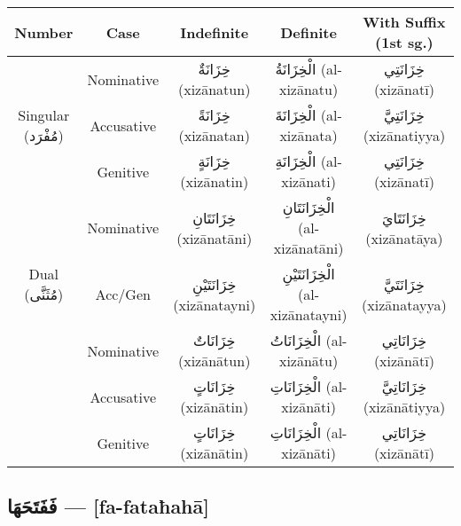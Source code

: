 \documentclass[letter,12pt]{article}
\begin{document}
\begin{tabular}{|c|c|c|c|c|}
\hline
\textbf{Number} & \textbf{Case} & \textbf{Indefinite} & \textbf{Definite} & \textbf{With Suffix (1st sg.)} \\
\hline
\multirow{3}{*}{Singular (\textarabic{مُفْرَد})} 
 & Nominative   & \textarabic{خِزَانَةٌ} (xizānatun) & \textarabic{الْخِزَانَةُ} (al-xizānatu) & \textarabic{خِزَانَتِي} (xizānatī) \\
 & Accusative   & \textarabic{خِزَانَةً} (xizānatan) & \textarabic{الْخِزَانَةَ} (al-xizānata) & \textarabic{خِزَانَتِيَّ} (xizānatiyya) \\
 & Genitive     & \textarabic{خِزَانَةٍ} (xizānatin) & \textarabic{الْخِزَانَةِ} (al-xizānati) & \textarabic{خِزَانَتِي} (xizānatī) \\
\hline
\multirow{3}{*}{Dual (\textarabic{مُثَنَّى})} 
 & Nominative   & \textarabic{خِزَانَتَانِ} (xizānatāni) & \textarabic{الْخِزَانَتَانِ} (al-xizānatāni) & \textarabic{خِزَانَتَايَ} (xizānatāya) \\
 & Acc/Gen      & \textarabic{خِزَانَتَيْنِ} (xizānatayni) & \textarabic{الْخِزَانَتَيْنِ} (al-xizānatayni) & \textarabic{خِزَانَتَيَّ} (xizānatayya) \\
\hline
\multirow{3}{*}{Plural (\textarabic{جَمْع})} 
  & Nominative    & \textarabic{خِزَانَاتٌ} (xizānātun) & \textarabic{الْخِزَانَاتُ} (al-xizānātu) & \textarabic{خِزَانَاتِي} (xizānātī) \\
  & Accusative      & \textarabic{خِزَانَاتٍ} (xizānātin) & \textarabic{الْخِزَانَاتِ} (al-xizānāti) & \textarabic{خِزَانَاتِيَّ} (xizānātiyya) \\
  & Genitive          & \textarabic{خِزَانَاتٍ} (xizānātin) & \textarabic{الْخِزَانَاتِ} (al-xizānāti) & \textarabic{خِزَانَاتِي} (xizānātī) \\
\hline
\end{tabular}

\subsection{\textarabic{فَفَتَحَهَا} — [fa-fataħahā]}
\end{document}
